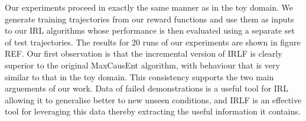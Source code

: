 \documentclass[letterpaper]{article}
\begin{document}
\vspace{-0.3mm}
Our experiments proceed in exactly the same manner as in the toy domain. We generate training trajectories from our reward functions and use them as inputs to our IRL algorithms whose performance is then evaluated using a separate set of test trajectories. The results for 20 runs of our experiments are shown in figure REF. Our first observation is that the incremental version of IRLF is clearly superior to the original MaxCausEnt algorithm, with behaviour that is very similar to that in the toy domain. This consistency supports the two main arguements of our work. Data of failed demonstrations is a useful tool for IRL allowing it to generalise better to new unseen conditions, and IRLF is an effective tool for leveraging this data thereby extracting the useful information it contains.
\end{document}
